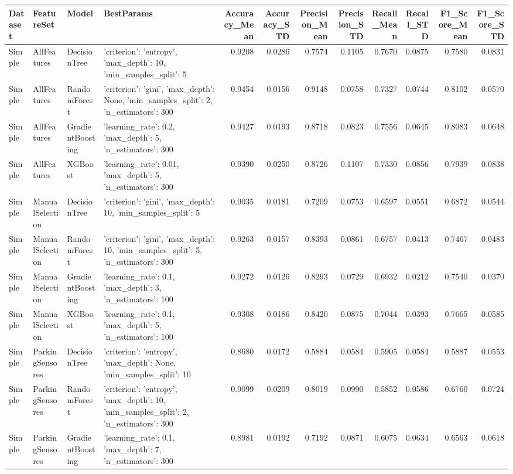 \begin{tabular}{llllrrrrrrrr}
\toprule
Dataset & FeatureSet & Model & BestParams & Accuracy_Mean & Accuracy_STD & Precision_Mean & Precision_STD & Recall_Mean & Recall_STD & F1_Score_Mean & F1_Score_STD \\
\midrule
Simple & AllFeatures & DecisionTree & {'criterion': 'entropy', 'max_depth': 10, 'min_samples_split': 5} & 0.9208 & 0.0286 & 0.7574 & 0.1105 & 0.7670 & 0.0875 & 0.7580 & 0.0831 \\
Simple & AllFeatures & RandomForest & {'criterion': 'gini', 'max_depth': None, 'min_samples_split': 2, 'n_estimators': 300} & 0.9454 & 0.0156 & 0.9148 & 0.0758 & 0.7327 & 0.0744 & 0.8102 & 0.0570 \\
Simple & AllFeatures & GradientBoosting & {'learning_rate': 0.2, 'max_depth': 5, 'n_estimators': 300} & 0.9427 & 0.0193 & 0.8718 & 0.0823 & 0.7556 & 0.0645 & 0.8083 & 0.0648 \\
Simple & AllFeatures & XGBoost & {'learning_rate': 0.01, 'max_depth': 5, 'n_estimators': 300} & 0.9390 & 0.0250 & 0.8726 & 0.1107 & 0.7330 & 0.0856 & 0.7939 & 0.0838 \\
Simple & ManualSelection & DecisionTree & {'criterion': 'gini', 'max_depth': 10, 'min_samples_split': 5} & 0.9035 & 0.0181 & 0.7209 & 0.0753 & 0.6597 & 0.0551 & 0.6872 & 0.0544 \\
Simple & ManualSelection & RandomForest & {'criterion': 'gini', 'max_depth': 10, 'min_samples_split': 5, 'n_estimators': 300} & 0.9263 & 0.0157 & 0.8393 & 0.0861 & 0.6757 & 0.0413 & 0.7467 & 0.0483 \\
Simple & ManualSelection & GradientBoosting & {'learning_rate': 0.1, 'max_depth': 3, 'n_estimators': 100} & 0.9272 & 0.0126 & 0.8293 & 0.0729 & 0.6932 & 0.0212 & 0.7540 & 0.0370 \\
Simple & ManualSelection & XGBoost & {'learning_rate': 0.1, 'max_depth': 5, 'n_estimators': 100} & 0.9308 & 0.0186 & 0.8420 & 0.0875 & 0.7044 & 0.0393 & 0.7665 & 0.0585 \\
Simple & ParkingSensores & DecisionTree & {'criterion': 'entropy', 'max_depth': None, 'min_samples_split': 10} & 0.8680 & 0.0172 & 0.5884 & 0.0584 & 0.5905 & 0.0584 & 0.5887 & 0.0553 \\
Simple & ParkingSensores & RandomForest & {'criterion': 'entropy', 'max_depth': 10, 'min_samples_split': 2, 'n_estimators': 300} & 0.9099 & 0.0209 & 0.8019 & 0.0990 & 0.5852 & 0.0586 & 0.6760 & 0.0724 \\
Simple & ParkingSensores & GradientBoosting & {'learning_rate': 0.1, 'max_depth': 7, 'n_estimators': 300} & 0.8981 & 0.0192 & 0.7192 & 0.0871 & 0.6075 & 0.0634 & 0.6563 & 0.0618 \\

\end{tabular}
